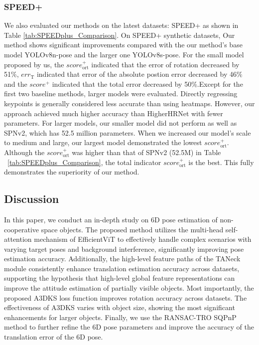\documentclass[a4paper,fleqn]{cas-sc}
\begin{document}
\subsubsection{SPEED+}
We also evaluated our methods on the latest datasets: SPEED+ as shown in Table \ref{tab:SPEEDplus_Comparison}. On SPEED+ synthetic datasets, Our method shows significant improvements compared with the our method's base model YOLOv8n-pose and the larger one YOLOv8s-pose. For the small model proposed by us, the $score_{\text{ort}}^+$ indicated that the error of rotation decreased by 51\%, $err_{\text{T}}$ indicated that error of the absolute postion error decreased by 46\% and the $score^+$ indicated that the total error decreased by 50\%.Except for the first two baseline methods, larger models were evaluated. Directly regressing keypoints is generally considered less accurate than using heatmaps. However, our approach achieved much higher accuracy than HigherHRNet with fewer parameters. For larger models, our smaller model did not perform as well as SPNv2, which has 52.5 million parameters. When we increased our model's scale to medium and large, our largest model demonstrated the lowest $score_{\text{ort}}^+$. Although the $score_{\text{ort}}^+$ was higher than that of SPNv2 (52.5M) in Table ~\ref{tab:SPEEDplus_Comparison}, the total indicator $score_{\text{ort}}^+$ is the best. This fully demonstrates the superiority of our method.




\subsection{Discussion}
In this paper, we conduct an in-depth study on 6D pose estimation of non-cooperative space objects. 
The proposed method utilizes the multi-head self-attention mechanism of EfficientViT 
to effectively handle complex scenarios with varying target poses and background interference, 
significantly improving pose estimation accuracy. Additionally, the high-level feature paths 
of the TANeck module consistently enhance translation estimation accuracy across datasets, 
supporting the hypothesis that high-level global feature representations can improve the 
attitude estimation of partially visible objects. Most importantly, the proposed A3DKS loss 
function improves rotation accuracy across datasets. The effectiveness of A3DKS varies with 
object size, showing the most significant enhancements for larger objects. Finally, we use 
the RANSAC-TRO SQPnP method to further refine the 6D pose parameters and improve the accuracy 
of the translation error of the 6D pose.
\end{document}
